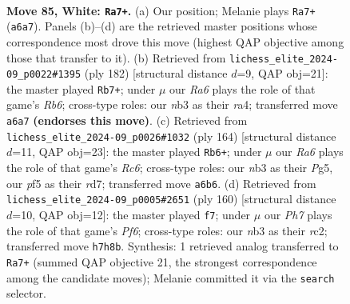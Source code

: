 \documentclass[11pt]{article}
\begin{document}
\clearpage

\begin{figure}[p]\centering
\begin{subfigure}{0.46\textwidth}\centering
\resizebox{\linewidth}{!}{%
\newchessgame
\chessboard[
  setfen={8/4k2P/R5p1/5p2/5P2/1n3K2/8/8 w - - 3 85},
  showmover=false,
  pgfstyle=straightmove, color=movearrow, markmove={a6-a7}
]}
\caption{}
\end{subfigure}\hfill
\begin{subfigure}{0.46\textwidth}\centering
\resizebox{\linewidth}{!}{%
\newchessgame
\chessboard[
  setfen={8/4k1p1/1R5p/3KP2P/r7/8/8/8 w - - 2 92},
  showmover=false,
  pgfstyle=straightmove, color=movearrow, markmove={b6-b7}
]}
\caption{}
\end{subfigure}
\\[4pt]
\begin{subfigure}{0.46\textwidth}\centering
\resizebox{\linewidth}{!}{%
\newchessgame
\chessboard[
  setfen={8/3r4/2R3p1/6P1/4P3/4K3/1kp5/8 w - - 10 83},
  showmover=false,
  pgfstyle=straightmove, color=movearrow, markmove={c6-b6}
]}
\caption{}
\end{subfigure}\hfill
\begin{subfigure}{0.46\textwidth}\centering
\resizebox{\linewidth}{!}{%
\newchessgame
\chessboard[
  setfen={8/8/1R3P2/3k2p1/6P1/1p4K1/2r5/8 w - - 7 81},
  showmover=false,
  pgfstyle=straightmove, color=movearrow, markmove={f6-f7}
]}
\caption{}
\end{subfigure}
\caption{\textbf{Move 85, White: \texttt{Ra7+}.} (a) Our position; Melanie plays \texttt{Ra7+} (\texttt{a6a7}). Panels (b)--(d) are the retrieved master positions whose correspondence most drove this move (highest QAP objective among those that transfer to it). (b) Retrieved from \texttt{lichess\_elite\_2024-09\_p0022\#1395} (ply 182) [structural distance $d$=9, QAP obj=21]: the master played \texttt{Rb7+}; under $\mu$ our \emph{Ra6} plays the role of that game's \emph{Rb6}; cross-type roles: our \emph{n}b3 as their \emph{r}a4; transferred move \texttt{a6a7} \textbf{(endorses this move)}. (c) Retrieved from \texttt{lichess\_elite\_2024-09\_p0026\#1032} (ply 164) [structural distance $d$=11, QAP obj=23]: the master played \texttt{Rb6+}; under $\mu$ our \emph{Ra6} plays the role of that game's \emph{Rc6}; cross-type roles: our \emph{n}b3 as their \emph{P}g5, our \emph{p}f5 as their \emph{r}d7; transferred move \texttt{a6b6}. (d) Retrieved from \texttt{lichess\_elite\_2024-09\_p0005\#2651} (ply 160) [structural distance $d$=10, QAP obj=12]: the master played \texttt{f7}; under $\mu$ our \emph{Ph7} plays the role of that game's \emph{Pf6}; cross-type roles: our \emph{n}b3 as their \emph{r}c2; transferred move \texttt{h7h8b}. Synthesis: 1 retrieved analog transferred to \texttt{Ra7+} (summed QAP objective 21, the strongest correspondence among the candidate moves); Melanie committed it via the \texttt{search} selector.}
\label{fig:thought-m168}
\end{figure}
\end{document}
